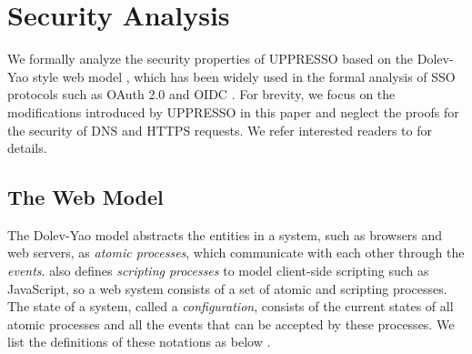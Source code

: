 \section{Security Analysis}
\label{sec:formal}

We  formally analyze  the security properties of UPPRESSO based on the Dolev-Yao style web model \cite{SPRESSO}, which has been widely used in the formal analysis of SSO protocols such as OAuth 2.0 \cite{FettKS16} and OIDC \cite{FettKS17}. For brevity, we focus on the modifications introduced by UPPRESSO in this paper and neglect the proofs for the security of DNS and HTTPS requests. We refer interested readers to \cite{SPRESSO} for details.
\subsection{The Web Model}
\label{subsec:webmodel}
The Dolev-Yao model abstracts the entities in a system, such as browsers and web servers, as {\em atomic processes}, which communicate with each other through the {\em events}. \cite{SPRESSO} also defines {\em scripting processes} to model client-side scripting such as JavaScript, so a web system consists of a set of atomic and scripting processes. The state of a system, called a {\em configuration}, consists of the current states of all atomic processes and all the events that can be accepted by these processes. We list the definitions of these notations as below \cite{SPRESSO}.

